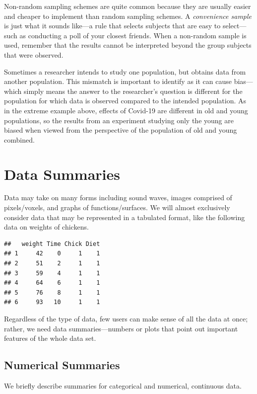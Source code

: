\documentclass[
]{book}
\begin{document}
Non-random sampling schemes are quite common because they are usually easier and cheaper to implement than random sampling schemes. A \emph{convenience sample} is just what it sounds like---a rule that selects subjects that are easy to select---such as conducting a poll of your closest friends. When a non-random sample is used, remember that the results cannot be interpreted beyond the group subjects that were observed.

Sometimes a researcher intends to study one population, but obtains data from another population. This mismatch is important to identify as it can cause bias---which simply means the answer to the researcher's question is different for the population for which data is observed compared to the intended population. As in the extreme example above, effects of Covid-19 are different in old and young populations, so the results from an experiment studying only the young are biased when viewed from the perspective of the population of old and young combined.

\hypertarget{data-summaries}{%
\section{Data Summaries}\label{data-summaries}}

Data may take on many forms including sound waves, images comprised of pixels/voxels, and graphs of functions/surfaces. We will almost exclusively consider data that may be represented in a tabulated format, like the following data on weights of chickens.

\begin{verbatim}
##   weight Time Chick Diet
## 1     42    0     1    1
## 2     51    2     1    1
## 3     59    4     1    1
## 4     64    6     1    1
## 5     76    8     1    1
## 6     93   10     1    1
\end{verbatim}

Regardless of the type of data, few users can make sense of all the data at once; rather, we need data summaries---numbers or plots that point out important features of the whole data set.

\hypertarget{numerical-summaries}{%
\subsection{Numerical Summaries}\label{numerical-summaries}}

We briefly describe summaries for categorical and numerical, continuous data.
\end{document}
